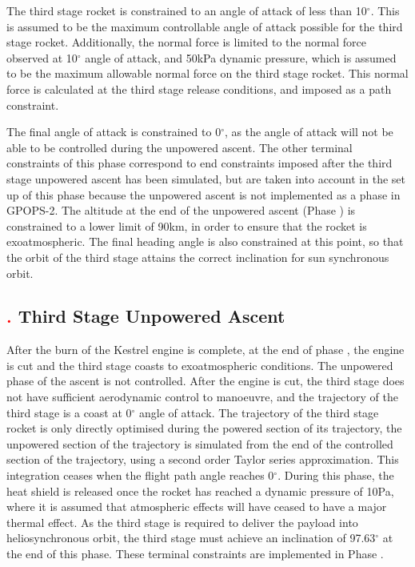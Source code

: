 The third stage rocket is constrained to an angle of attack of less than 10$^\circ$. This is assumed to be the maximum controllable angle of attack possible for the third stage rocket.   
Additionally, the normal force is limited to the normal force observed at 10$^\circ$ angle of attack, and 50kPa\cite{Preller2017b} dynamic pressure, which is assumed to be the maximum allowable normal force on the third stage rocket. This normal force is calculated at the third stage release conditions, and imposed as a path constraint. 

The final angle of attack is constrained to 0$^\circ$, as the angle of attack will not be able to be controlled during the unpowered ascent. 
The other terminal constraints of this phase correspond to end constraints imposed after the third stage unpowered ascent has been simulated, but are taken into account in the set up of this phase because the unpowered ascent is not implemented as a phase in GPOPS-2. The altitude at the end of the unpowered ascent (Phase \textcolor{red}{}) is constrained to a lower limit of 90km, in order to ensure that the rocket is exoatmospheric. The final heading angle is also constrained at this point, so that the orbit of the third stage attains the correct inclination for sun synchronous orbit. 


\subsection{\textcolor{red}{.} Third Stage Unpowered Ascent}
After the burn of the Kestrel engine is complete, at the end of phase \textcolor{red}{}, the engine is cut and the third stage coasts to exoatmospheric conditions. 
The unpowered phase of the ascent is not controlled. After the engine is cut, the third stage does not have sufficient aerodynamic control to manoeuvre, and the trajectory of the third stage is a coast at 0$^\circ$ angle of attack. The trajectory of the third stage rocket is only directly optimised during the powered section of its trajectory, the unpowered section of the trajectory is simulated from the end of the controlled section of the trajectory, using a second order Taylor series approximation. This integration ceases when the flight path angle reaches 0$^{\circ}$.
During this phase, the heat shield is released once the rocket has reached a dynamic pressure of 10Pa, where it is assumed that atmospheric effects will have ceased to have a major thermal effect.  As the third stage is required to deliver the payload into heliosynchronous orbit, the third stage must achieve an inclination of 97.63$^\circ$ at the end of this phase\cite{Boain2004}. These terminal constraints are implemented in Phase \textcolor{red}{}.



